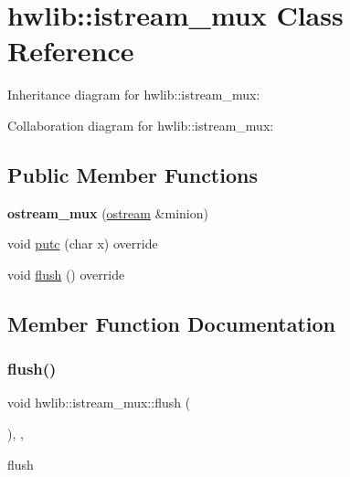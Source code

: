 \hypertarget{classhwlib_1_1istream__mux}{}\section{hwlib\+:\+:istream\+\_\+mux Class Reference}
\label{classhwlib_1_1istream__mux}


Inheritance diagram for hwlib\+:\+:istream\+\_\+mux\+:


Collaboration diagram for hwlib\+:\+:istream\+\_\+mux\+:
\subsection*{Public Member Functions}
\begin{DoxyCompactItemize}
\item 
\mbox{\label{classhwlib_1_1istream__mux_ae0a09ad68e9693098281f32a60c3d9a6}} 
{\bfseries ostream\+\_\+mux} (\hyperlink{classhwlib_1_1ostream}{ostream} \&minion)
\item 
void \hyperlink{classhwlib_1_1istream__mux_a34deb0a6755b04923c4c8206452af37b}{putc} (char x) override
\item 
void \hyperlink{classhwlib_1_1istream__mux_a33f8cfde26e1c3dcf2867c2e0fce3582}{flush} () override
\end{DoxyCompactItemize}


\subsection{Member Function Documentation}
\mbox{\label{classhwlib_1_1istream__mux_a33f8cfde26e1c3dcf2867c2e0fce3582}} 
\subsubsection{\texorpdfstring{flush()}{flush()}}
{\footnotesize\ttfamily void hwlib\+::istream\+\_\+mux\+::flush (\begin{DoxyParamCaption}{ }\end{DoxyParamCaption})\hspace{0.3cm}{\ttfamily [inline]}, {\ttfamily [override]}, {\ttfamily [virtual]}}

flush

